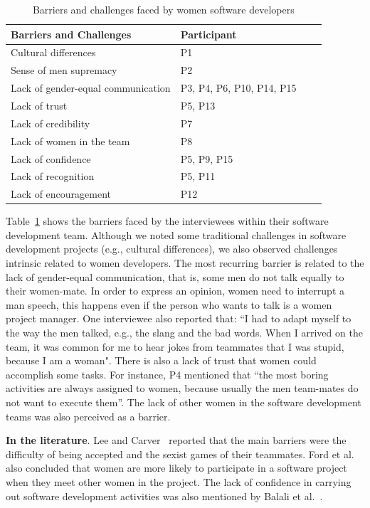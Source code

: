 \documentclass{IEEEcsmag}
\begin{document}
\begin{table}[htb]
    \centering
    \caption{Barriers and challenges faced by women software developers}
    \label{tab:barrier}
    \begin{tabular}{lp{2cm}lp{2cm}} 
    \toprule
    \textbf{Barriers and Challenges} & \textbf{Participant} \\ 
    \midrule
    Cultural differences & P1 &  \\ 
    Sense of men supremacy & P2 \\ 
    Lack of gender-equal communication & P3, P4, P6, P10, P14, P15 \\
    Lack of trust & P5, P13\\ 
    Lack of credibility & P7 \\ 
    Lack of women in the team & P8 \\ 
    Lack of confidence & P5, P9, P15 \\ 
    Lack of recognition & P5, P11  \\ 
    Lack of encouragement & P12 \\
    \bottomrule
    \end{tabular}
\end{table}

Table~\ref{tab:barrier} shows the barriers faced by the interviewees within their software development team. Although we noted some traditional challenges in software development projects (e.g., cultural differences), we also observed challenges intrinsic related to women developers. The most recurring barrier is related to the lack of gender-equal communication, that is, some men do not talk equally to their women-mate. In order to express an opinion, women need to interrupt a man speech, this happens even if the person who wants to talk is a women project manager. One interviewee also reported that: ``I had to adapt myself to the way the men talked, e.g., the slang and the bad words. When I arrived on the team, it was common for me to hear jokes from teammates that I was stupid, because I am a woman". There is also a lack of trust that women could accomplish some tasks. For instance, P4 mentioned that ``the most boring activities are always assigned to women, because usually the men team-mates do not want to execute them''. The lack of other women in the software development teams was also perceived as a barrier. 

\vspace{0.2cm}
\noindent
\textbf{In the literature}. Lee and Carver~\cite{DBLP:conf/icse/LeeC19} reported that the main barriers were the difficulty of being accepted and the sexist games of their teammates. Ford et al.~\cite{DBLP:conf/vl/FordHP17} also concluded that women are more likely to participate in a software project when they meet other women in the project. The lack of confidence in carrying out software development activities was also mentioned by Balali et al.~\cite{DBLP:journals/cscw/BalaliSASG18}.
\end{document}

